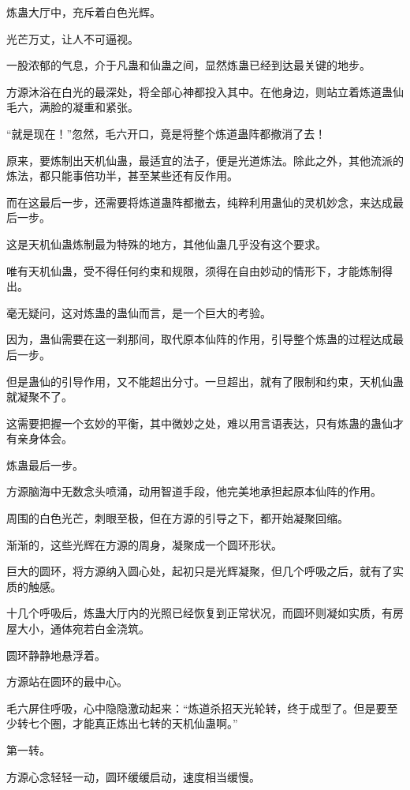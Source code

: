 
\begin{this_body}

炼蛊大厅中，充斥着白色光辉。

光芒万丈，让人不可逼视。

一股浓郁的气息，介于凡蛊和仙蛊之间，显然炼蛊已经到达最关键的地步。

方源沐浴在白光的最深处，将全部心神都投入其中。在他身边，则站立着炼道蛊仙毛六，满脸的凝重和紧张。

“就是现在！”忽然，毛六开口，竟是将整个炼道蛊阵都撤消了去！

原来，要炼制出天机仙蛊，最适宜的法子，便是光道炼法。除此之外，其他流派的炼法，都只能事倍功半，甚至某些还有反作用。

而在这最后一步，还需要将炼道蛊阵都撤去，纯粹利用蛊仙的灵机妙念，来达成最后一步。

这是天机仙蛊炼制最为特殊的地方，其他仙蛊几乎没有这个要求。

唯有天机仙蛊，受不得任何约束和规限，须得在自由妙动的情形下，才能炼制得出。

毫无疑问，这对炼蛊的蛊仙而言，是一个巨大的考验。

因为，蛊仙需要在这一刹那间，取代原本仙阵的作用，引导整个炼蛊的过程达成最后一步。

但是蛊仙的引导作用，又不能超出分寸。一旦超出，就有了限制和约束，天机仙蛊就凝聚不了。

这需要把握一个玄妙的平衡，其中微妙之处，难以用言语表达，只有炼蛊的蛊仙才有亲身体会。

炼蛊最后一步。

方源脑海中无数念头喷涌，动用智道手段，他完美地承担起原本仙阵的作用。

周围的白色光芒，刺眼至极，但在方源的引导之下，都开始凝聚回缩。

渐渐的，这些光辉在方源的周身，凝聚成一个圆环形状。

巨大的圆环，将方源纳入圆心处，起初只是光辉凝聚，但几个呼吸之后，就有了实质的触感。

十几个呼吸后，炼蛊大厅内的光照已经恢复到正常状况，而圆环则凝如实质，有房屋大小，通体宛若白金浇筑。

圆环静静地悬浮着。

方源站在圆环的最中心。

毛六屏住呼吸，心中隐隐激动起来：“炼道杀招天光轮转，终于成型了。但是要至少转七个圈，才能真正炼出七转的天机仙蛊啊。”

第一转。

方源心念轻轻一动，圆环缓缓启动，速度相当缓慢。


\end{this_body}
